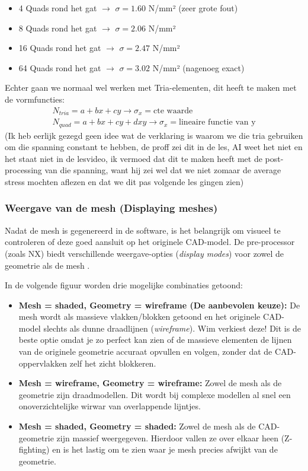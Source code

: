 \documentclass[a4paper,11pt,twoside]{report}
\begin{document}
\begin{itemize}
    \item 4 Quads rond het gat $\rightarrow$ $\sigma = 1.60$ N/mm² (zeer grote fout)
    \item 8 Quads rond het gat $\rightarrow$ $\sigma = 2.06$ N/mm²
    \item 16 Quads rond het gat $\rightarrow$ $\sigma = 2.47$ N/mm²
    \item 64 Quads rond het gat $\rightarrow$ $\sigma = 3.02$ N/mm² (nagenoeg exact)
\end{itemize}
Echter gaan we normaal wel werken met Tria-elementen, dit heeft te maken met de vormfuncties:
\begin{align*}
    N_{tria} = a + bx + cy \rightarrow \sigma_x = \text{cte waarde} \\
    N_{quad} = a + bx + cy + dxy \rightarrow \sigma_x = \text{lineaire functie van y}
\end{align*}
(Ik heb eerlijk gezegd geen idee wat de verklaring is waarom we die tria gebruiken om die spanning
constant te hebben, de proff zei dit in de les, AI weet het niet en het staat niet in de lesvideo,
ik vermoed dat dit te maken heeft met de post-processing van die spanning, want hij zei wel dat we
niet zomaar de average stress mochten aflezen en dat we dit pas volgende les gingen zien)
\subsubsection{Weergave van de mesh (Displaying meshes)}
Nadat de mesh is gegenereerd in de software, is het belangrijk om visueel te controleren of deze
goed aansluit op het originele CAD-model. De pre-processor (zoals NX) biedt verschillende
weergave-opties (\textit{display modes}) voor zowel de geometrie als de mesh .

In de volgende figuur worden drie mogelijke combinaties getoond:
\begin{itemize}
    \item \textbf{Mesh = shaded, Geometry = wireframe (De aanbevolen keuze):} De mesh wordt als
          massieve vlakken/blokken getoond en het originele CAD-model slechts als dunne draadlijnen
          (\textit{wireframe}). Wim verkiest deze! Dit is de beste optie omdat je zo perfect kan zien of
          de massieve elementen de lijnen van de originele geometrie accuraat opvullen en volgen, zonder
          dat de CAD-oppervlakken zelf het zicht blokkeren.
    \item \textbf{Mesh = wireframe, Geometry = wireframe:} Zowel de mesh als de geometrie zijn
          draadmodellen. Dit wordt bij complexe modellen al snel een onoverzichtelijke wirwar van
          overlappende lijntjes.
    \item \textbf{Mesh = shaded, Geometry = shaded:} Zowel de mesh als de CAD-geometrie zijn massief
          weergegeven. Hierdoor vallen ze over elkaar heen (Z-fighting) en is het lastig om te zien waar
          je mesh precies afwijkt van de geometrie.
\end{itemize}
\end{document}
